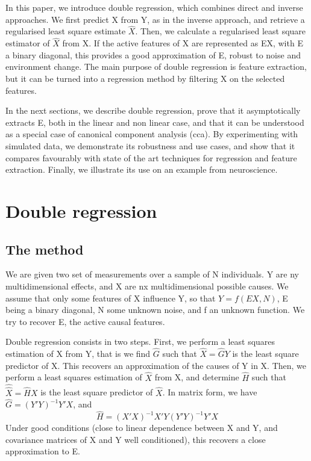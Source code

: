 \documentclass{article}
\begin{document}
In this paper, we introduce double regression, which combines direct and inverse approaches. We first predict X from Y, as in the inverse approach, and retrieve a regularised least square estimate $\hat X$. Then, we calculate a regularised least square estimator of $\hat X$ from X. If the active features of X are represented as EX, with E a binary diagonal, this provides a good approximation of E, robust to noise and environment change. The main purpose of double regression is feature extraction, but it can be turned into a regression method by filtering X on the selected features.

In the next sections, we describe double regression, prove that it asymptotically extracts E, both in the linear and non linear case, and that it can be understood as a special case of canonical component analysis (cca). By experimenting with simulated data, we demonstrate its robustness and use cases, and show that it compares favourably with state of the art techniques for regression and feature extraction. Finally, we illustrate its use on an example from neuroscience.

\section{Double regression}
\subsection{The method}
We are given two set of measurements over a sample of N individuals. Y are ny multidimensional effects, and X are nx multidimensional possible causes. We assume that only some features of X influence Y, so that $Y=f(EX,N)$, E being a binary diagonal, N some unknown noise, and f an unknown function. We try to recover E, the active causal features. 

Double regression consists in two steps. First, we perform a least squares estimation of X from Y, that is we find $\hat G$ such that $\hat X=\hat G Y$ is the least square predictor of X. This recovers an approximation of the causes of Y in X. Then, we perform a least squares estimation of $\hat X$ from X, and determine $\hat H$ such that $\hat {\hat X}=\hat H X$ is the least square predictor of $\hat X$. In matrix form, we have $\hat G=(Y'Y)^{-1} Y'X$, and 
\begin{equation} \hat H=(X'X)^{-1} X'Y(Y'Y)^{-1} Y'X\end{equation}
Under good conditions (close to linear dependence between X and Y, and covariance matrices of X and Y well conditioned), this recovers a close approximation to E.
\end{document}
